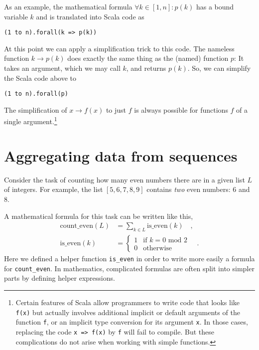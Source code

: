 As an example, the mathematical formula $\forall k\in\left[1,n\right]:p\left(k\right)$
has a bound variable $k$ and is translated into Scala code as

\begin{lstlisting}
(1 to n).forall(k => p(k))
\end{lstlisting}
At this point we can apply a simplification trick to this code. The
nameless function $k\rightarrow p(k)$ does exactly the same thing
as the (named) function $p$: It takes an argument, which we may call
$k$, and returns $p(k)$. So, we can simplify the Scala code above
to

\begin{lstlisting}
(1 to n).forall(p)
\end{lstlisting}

The simplification of $x\rightarrow f(x)$ to just $f$ is always
possible for functions $f$ of a single argument.\footnote{Certain features of Scala allow programmers to write code that looks
like \lstinline!f(x)! but actually involves additional implicit or
default arguments of the function \lstinline!f!, or an implicit type
conversion for its argument \lstinline!x!. In those cases, replacing
the code \lstinline!x => f(x)! by \lstinline!f! will fail to compile.
But these complications do not arise when working with simple functions.}

\section{Aggregating data from sequences}

Consider the task of counting how many even numbers there are in a
given list $L$ of integers. For example, the list $\left[5,6,7,8,9\right]$
contains \emph{two} even numbers: $6$ and $8$.

A mathematical formula for this task can be written like this,
\begin{align*}
\text{count\_even}\left(L\right) & =\sum_{k\in L}\text{is\_even}\left(k\right)\quad,\\
\text{is\_even}\left(k\right) & =\begin{cases}
1 & \text{if }k=0\text{ mod }2\\
0 & \text{otherwise}
\end{cases}\quad.
\end{align*}
Here we defined a helper function \texttt{}\lstinline!is_even! in
order to write more easily a formula for \lstinline!count_even!.
In mathematics, complicated formulas are often split into simpler
parts by defining helper expressions. 


